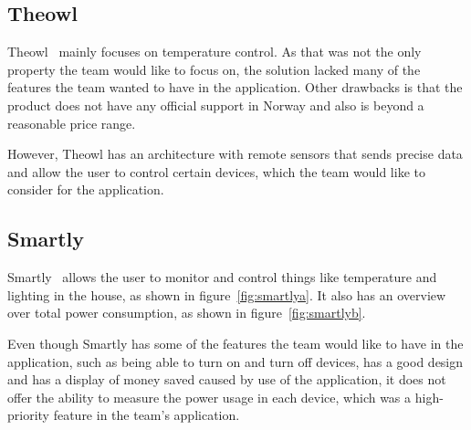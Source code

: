 \subsection{Theowl}

Theowl~\cite{theowl} mainly focuses on temperature control. 
As that was not the only property the team would like to focus on, the solution lacked many of the features the team wanted to have in the application. Other drawbacks is that the product does not have any official support in Norway and also is beyond a reasonable price range. 

However, Theowl has an architecture with remote sensors that sends precise data and allow the user to control certain devices, which the team would like to consider for the application.


\subsection{Smartly}

Smartly~\cite{smartly} allows the user to monitor and control things like temperature and lighting in the house, as shown in figure~\ref{fig:smartlya}. It also has an overview over total power consumption, as shown in figure~\ref{fig:smartlyb}.

Even though Smartly has some of the features the team would like to have in the application, such as being able to turn on and turn off devices, has a good design and has a display of money saved caused by use of the application, it does not offer the ability to measure the power usage in each device, which was a high-priority feature in the team's application.


